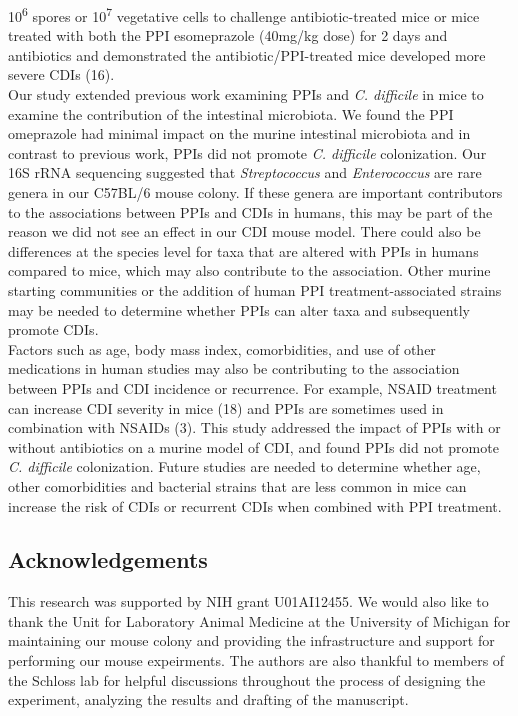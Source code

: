 \documentclass[11pt,]{article}
\begin{document}
10\textsuperscript{6} spores or 10\textsuperscript{7} vegetative cells
to challenge antibiotic-treated mice or mice treated with both the PPI
esomeprazole (40mg/kg dose) for 2 days and antibiotics and demonstrated
the antibiotic/PPI-treated mice developed more severe CDIs (16).\\
Our study extended previous work examining PPIs and \emph{C. difficile}
in mice to examine the contribution of the intestinal microbiota. We
found the PPI omeprazole had minimal impact on the murine intestinal
microbiota and in contrast to previous work, PPIs did not promote
\emph{C. difficile} colonization. Our 16S rRNA sequencing suggested that
\emph{Streptococcus} and \emph{Enterococcus} are rare genera in our
C57BL/6 mouse colony. If these genera are important contributors to the
associations between PPIs and CDIs in humans, this may be part of the
reason we did not see an effect in our CDI mouse model. There could also
be differences at the species level for taxa that are altered with PPIs
in humans compared to mice, which may also contribute to the
association. Other murine starting communities or the addition of human
PPI treatment-associated strains may be needed to determine whether PPIs
can alter taxa and subsequently promote CDIs.\\
Factors such as age, body mass index, comorbidities, and use of other
medications in human studies may also be contributing to the association
between PPIs and CDI incidence or recurrence. For example, NSAID
treatment can increase CDI severity in mice (18) and PPIs are sometimes
used in combination with NSAIDs (3). This study addressed the impact of
PPIs with or without antibiotics on a murine model of CDI, and found
PPIs did not promote \emph{C. difficile} colonization. Future studies
are needed to determine whether age, other comorbidities and bacterial
strains that are less common in mice can increase the risk of CDIs or
recurrent CDIs when combined with PPI treatment.

\subsection{Acknowledgements}\label{acknowledgements}

This research was supported by NIH grant U01AI12455. We would also like
to thank the Unit for Laboratory Animal Medicine at the University of
Michigan for maintaining our mouse colony and providing the
infrastructure and support for performing our mouse expeirments. The
authors are also thankful to members of the Schloss lab for helpful
discussions throughout the process of designing the experiment,
analyzing the results and drafting of the manuscript.
\end{document}
